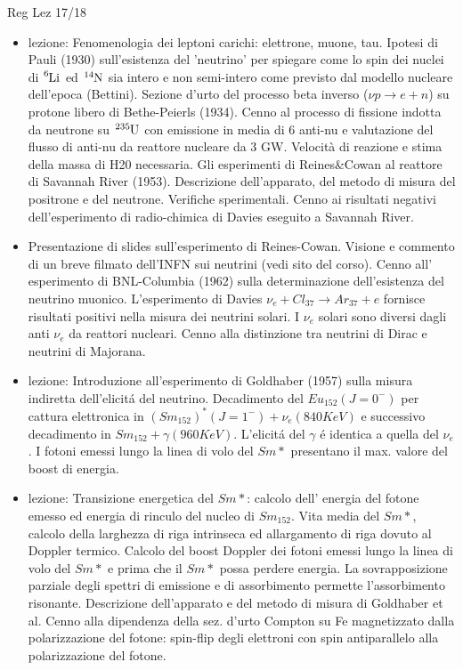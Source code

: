 \begin{frame}[allowframebreaks]{Reg Lez 17/18}
\begin{itemize}
\item  lezione: Fenomenologia dei leptoni carichi: elettrone, muone, tau. Ipotesi di Pauli (1930) sull'esistenza del 'neutrino' per spiegare come lo spin dei nuclei di $\cel{Li}{6}{}{}$ ed $\cel{N}{14}{}{}$ sia intero e non semi-intero come previsto dal modello nucleare dell'epoca (Bettini). Sezione d'urto del processo beta inverso ($\nu p\to e+n$) su protone libero di Bethe-Peierls (1934). Cenno al processo di fissione indotta da neutrone su $\cel{U}{235}{}{}$ con emissione in media di 6 anti-nu e valutazione del flusso di anti-nu da reattore nucleare da 3 GW. Velocità di reazione e stima della massa di H20 necessaria. Gli esperimenti di Reines\&Cowan al reattore di Savannah River (1953). Descrizione dell'apparato, del metodo di misura del positrone e del neutrone. Verifiche sperimentali. Cenno ai risultati negativi dell'esperimento di radio-chimica di Davies eseguito a Savannah River.
\item  Presentazione di slides sull'esperimento di Reines-Cowan. Visione e commento di un breve filmato dell'INFN sui neutrini (vedi sito del corso). Cenno all' esperimento di BNL-Columbia (1962) sulla determinazione dell'esistenza del neutrino muonico. L'esperimento di Davies $\nu_e+Cl_{37}\to Ar_{37}+e$ fornisce risultati positivi nella misura dei neutrini solari. I $\nu_e$ solari sono diversi dagli anti $\nu_e$ da reattori nucleari. Cenno alla distinzione tra neutrini di Dirac e neutrini di Majorana.
\item  lezione: Introduzione all'esperimento di Goldhaber (1957) sulla misura indiretta dell'elicit\'a del neutrino. Decadimento del $Eu_{152}(J=0^-)$ per cattura elettronica in $(Sm_{152})^*(J=1^-)+\nu_e(840KeV)$ e successivo decadimento in $Sm_{152}+\gamma(960KeV)$. L'elicit\'a del $\gamma$ \'e identica a quella del $\nu_e$. I fotoni emessi lungo la linea di volo del $Sm*$ presentano il max. valore del boost di energia.
\item  lezione: Transizione energetica del $Sm*$: calcolo dell' energia del fotone emesso ed energia di rinculo del nucleo di $Sm_{152}$. Vita media del $Sm*$, calcolo della larghezza di riga intrinseca ed allargamento di riga dovuto al Doppler termico. Calcolo del boost Doppler dei fotoni emessi lungo la linea di volo del $Sm*$ e prima che il $Sm*$ possa perdere energia. La sovrapposizione parziale degli spettri di emissione e di assorbimento permette l'assorbimento risonante. Descrizione dell'apparato e del metodo di misura di Goldhaber et al. Cenno alla dipendenza della sez. d'urto Compton su Fe magnetizzato dalla polarizzazione del fotone: spin-flip degli elettroni con spin antiparallelo alla polarizzazione del fotone.

\end{itemize}
\end{frame}
